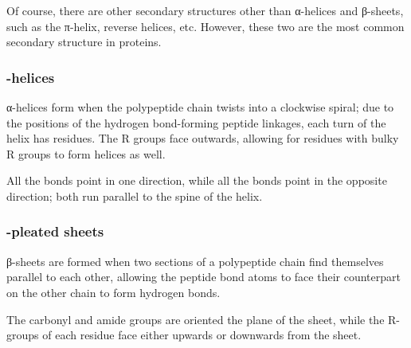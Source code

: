 			Of course, there are other secondary structures other than α-helices and β-sheets, such as the π-helix, reverse helices, etc.
			However, these two are the most common secondary structure in proteins.


			\pagebreak
			\subsubsection{\chemalpha-helices}

				α-helices form when the polypeptide chain twists into a clockwise spiral; due to the positions of the
				hydrogen bond-forming peptide linkages, each turn of the helix has  residues. The R groups face outwards, allowing for
				residues with bulky R groups to form helices as well.

				All the  bonds point in one direction, while all the  bonds point in the opposite direction; both run parallel
				to the spine of the helix.




			\subsubsection{\chembeta-pleated sheets}

				β-sheets are formed when two sections of a polypeptide chain find themselves parallel to each other, allowing the peptide bond
				atoms to face their counterpart on the other chain to form hydrogen bonds.

				The carbonyl and amide groups are oriented  the plane of the sheet, while the R-groups of each residue face either
				upwards or downwards from the sheet.

